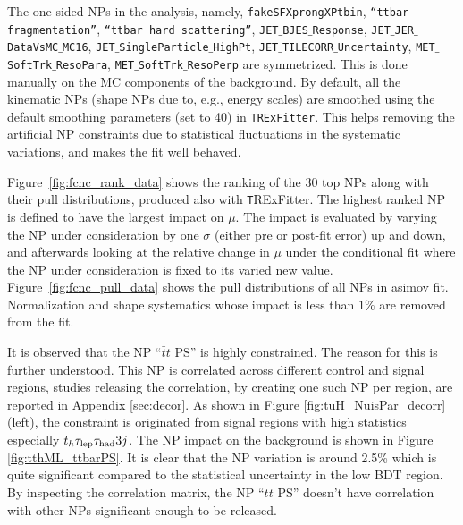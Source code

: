 The one-sided NPs in the analysis, namely, \texttt{fakeSFXprongXPtbin}, \texttt{``ttbar fragmentation''}, \texttt{``ttbar hard scattering''}, \texttt{JET$\_$BJES$\_$Response}, \texttt{JET$\_$JER$\_$DataVsMC$\_$MC16}, \texttt{JET$\_$SingleParticle$\_$HighPt}, \texttt{JET$\_$TILECORR$\_$Uncertainty}, \texttt{MET$\_$SoftTrk$\_$ResoPara}, \texttt{MET$\_$SoftTrk$\_$ResoPerp} are symmetrized. This is done manually on the MC components of the background. By default, all the kinematic NPs (shape NPs due to, e.g., energy scales) are smoothed using the default smoothing parameters (set to 40) in \texttt{TRExFitter}. This helps removing the artificial NP constraints due to statistical fluctuations in the systematic variations, and makes the fit well behaved. %

Figure~\ref{fig:fcnc_rank_data} shows the ranking of the 30 top NPs along with their pull distributions, produced also with {\texttt TRExFitter}. The highest ranked NP is defined to have the largest impact on $\mu$. The impact is evaluated by varying the NP under consideration by one $\sigma$ (either pre or post-fit error) up and down, and afterwards looking at the relative change in $\mu$ under the conditional fit where the NP under consideration is fixed to its varied new value.
Figure~\ref{fig:fcnc_pull_data} shows the pull distributions of all NPs in asimov fit. %
Normalization and shape systematics whose impact is less than $1\%$ are removed from the fit. %

It is observed that the NP ``$\bar{t}t$ PS'' is highly constrained. The reason for this is further understood. This NP is correlated across different control and signal regions, studies releasing the correlation, by creating one such NP per region, are reported in Appendix \ref{sec:decor}. As shown  in Figure \ref{fig:tuH_NuisPar_decorr} (left), the constraint is originated from signal regions with high statistics especially $t_h\tau_\text{lep}{}\tau_\text{had} 3j$. The NP impact on the background is shown in Figure \ref{fig:tthML_ttbarPS}. It is clear that the NP variation is around 2.5\% which is quite significant compared to the statistical uncertainty in the low BDT region. By inspecting the correlation matrix, the NP ``$\bar{t}t$ PS'' doesn't have correlation with other NPs significant enough to be released.

